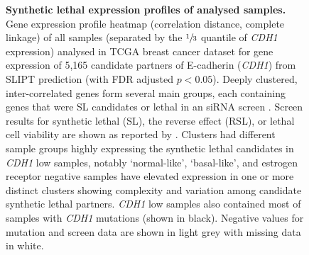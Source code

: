 \begin{figure}[!ht]
  \centering
    \caption[Synthetic lethal expression profiles of analysed samples]{\small \textbf{Synthetic lethal expression profiles of analysed samples.} Gene expression profile heatmap (correlation distance, complete linkage) of all samples (separated by the $\sfrac{1}{3}$ quantile of \textit{CDH1} expression) analysed in TCGA breast cancer dataset for gene expression of 5,165 candidate partners of E-cadherin (\textit{CDH1}) from \gls{SLIPT} prediction (with FDR adjusted $p < 0.05$). Deeply clustered, inter-correlated genes form several main groups, each containing genes that were SL candidates or lethal in an \gls{siRNA} screen \citep{Telford2015}. Screen results for synthetic lethal (SL), the reverse effect (RSL), or lethal cell viability are shown as reported by \citet{Telford2015}. Clusters had different sample groups highly expressing the synthetic lethal candidates in \textit{CDH1} low samples, notably `normal-like', `basal-like', and estrogen receptor negative samples have elevated expression in one or more distinct clusters showing complexity and variation among candidate synthetic lethal partners. \textit{CDH1} low samples also contained most of samples with \textit{CDH1} mutations (shown in black). Negative values for mutation and screen data are shown in light grey with missing data in white.
}
\label{fig:slipt_expr}
\end{figure}


